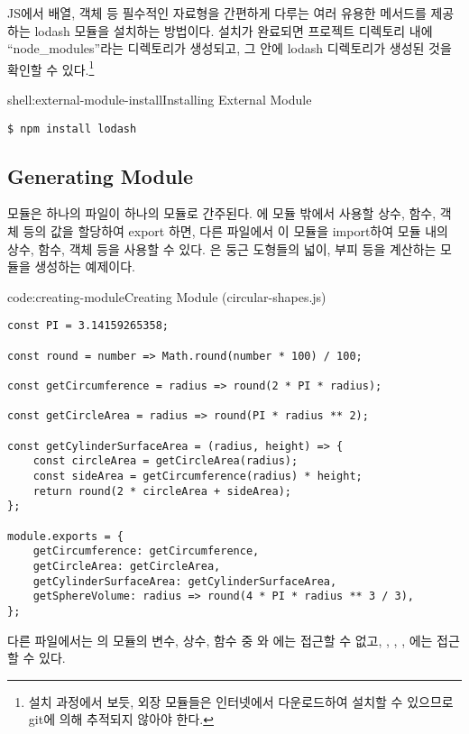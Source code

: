 \은 JS에서 배열, 객체 등 필수적인 자료형을 간편하게 다루는 여러 유용한 메서드를 제공하는 lodash 모듈을 설치하는 방법이다. 설치가 완료되면 프로젝트 디렉토리 내에 ``node\_modules''라는 디렉토리가 생성되고, 그 안에 lodash 디렉토리가 생성된 것을 확인할 수 있다.\footnote{설치 과정에서 보듯, 외장 모듈들은 인터넷에서 다운로드하여 설치할 수 있으므로 git에 의해 추적되지 않아야 한다.}

\begin{shellenv}{shell:external-module-install}{Installing External Module}\begin{verbatim}
$ npm install lodash
\end{verbatim}
\end{shellenv}
\clearpage

\subsection*{Generating Module}

모듈은 하나의 파일이 하나의 모듈로 간주된다. 에 모듈 밖에서 사용할 상수, 함수, 객체 등의 값을 할당하여 export 하면, 다른 파일에서 이 모듈을 import하여 모듈 내의 상수, 함수, 객체 등을 사용할 수 있다. 은 둥근 도형들의 넓이, 부피 등을 계산하는 모듈을 생성하는 예제이다.

\begin{codeenv}{code:creating-module}{Creating Module (circular-shapes.js)}\begin{verbatim}
const PI = 3.14159265358;

const round = number => Math.round(number * 100) / 100;

const getCircumference = radius => round(2 * PI * radius);

const getCircleArea = radius => round(PI * radius ** 2);

const getCylinderSurfaceArea = (radius, height) => {
    const circleArea = getCircleArea(radius);
    const sideArea = getCircumference(radius) * height;
    return round(2 * circleArea + sideArea);
};

module.exports = {
    getCircumference: getCircumference,
    getCircleArea: getCircleArea,
    getCylinderSurfaceArea: getCylinderSurfaceArea,
    getSphereVolume: radius => round(4 * PI * radius ** 3 / 3),
};
\end{verbatim}
\end{codeenv}

다른 파일에서는 의 모듈의 변수, 상수, 함수 중 와 에는 접근할 수 없고, , , , 에는 접근할 수 있다.

